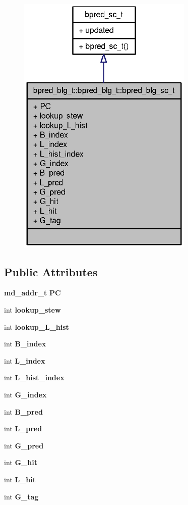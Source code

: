 \begin{figure}[H]
\begin{center}
\leavevmode
\includegraphics[width=238pt]{classbpred__blg__t_1_1bpred__blg__sc__t__coll__graph}
\end{center}
\end{figure}
\subsection*{Public Attributes}
\begin{CompactItemize}
\item 
{\bf md\_\-addr\_\-t} {\bf PC}
\item 
int {\bf lookup\_\-stew}
\item 
int {\bf lookup\_\-L\_\-hist}
\item 
int {\bf B\_\-index}
\item 
int {\bf L\_\-index}
\item 
int {\bf L\_\-hist\_\-index}
\item 
int {\bf G\_\-index}
\item 
int {\bf B\_\-pred}
\item 
int {\bf L\_\-pred}
\item 
int {\bf G\_\-pred}
\item 
int {\bf G\_\-hit}
\item 
int {\bf L\_\-hit}
\item 
int {\bf G\_\-tag}
\end{CompactItemize}


